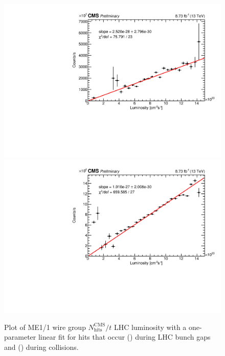 \begin{figure}
	\centering
	\includegraphics[width=\dummyFigWidth]{figures/neutron/luminosity_11_wire_early_CHAM_TIME_20180416_fit.pdf}
	\includegraphics[width=\dummyFigWidth]{figures/neutron/luminosity_11_wire_total_CHAM_TIME_20180416_fit.pdf}
  \caption[Plot of ME1/1 wire group ${N}^\text{CMS}_\text{hits} / {t}$ \vs LHC luminosity with a one-parameter linear fit for hits that occur during LHC bunch gaps and during \pp collisions.]{Plot of ME1/1 wire group ${N}^\text{CMS}_\text{hits} / {t}$ \vs LHC luminosity with a one-parameter linear fit for hits that occur () during LHC bunch gaps and () during \pp collisions.}
	\label{fig:ME11_HvsL}
\end{figure}


